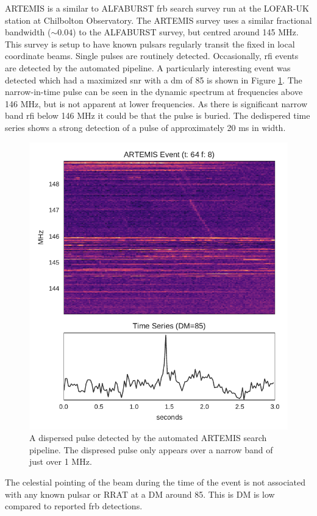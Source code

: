 \documentclass[a4paper,fleqn,usenatbib]{mnras}
\begin{document}
ARTEMIS \citep{2015MNRAS.452.1254K} is a similar to ALFABURST \gls{frb} search
survey run at the LOFAR-UK station at Chilbolton Observatory. The ARTEMIS survey
uses a similar fractional bandwidth ($\sim 0.04$) to the ALFABURST survey, but
centred around 145 MHz. This survey is setup to have known pulsars regularly
transit the fixed in local coordinate beams. Single pulses are routinely
detected. Occasionally, \gls{rfi} events are detected by the automated pipeline. 
A particularly interesting event was detected which had a maximized \gls{snr}
with a \gls{dm} of 85 is shown in Figure \ref{fig:lofar_dynamic}. The
narrow-in-time pulse can be seen in the dynamic spectrum at frequencies above
146 MHz, but is not apparent at lower frequencies. As there is significant
narrow band \gls{rfi} below 146 MHz it could be that the pulse is buried. The
dedispered time series shows a strong detection of a pulse of approximately 20
ms in width.
%
\begin{figure}
    \includegraphics[width=1.0\linewidth]{figures/LOFAR_dynamic.pdf}
    \caption{A dispersed pulse detected by the automated ARTEMIS search
    pipeline. The dispresed pulse only appears over a narrow band of just over 1
    MHz.
    }
    \label{fig:lofar_dynamic}
\end{figure}
%
The celestial pointing of the beam during the time of the event is not
associated with any known pulsar or RRAT at a DM around 85. This is DM is low
compared to reported \gls{frb} detections.
\end{document}
